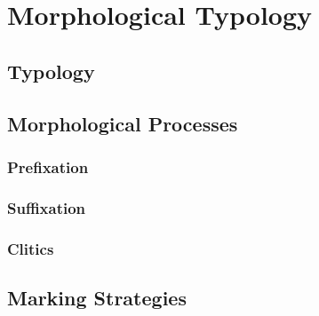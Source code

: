 \chapter{Morphological Typology}
\label{cha:morphological-typology}

\section{Typology}
\label{sec:typology}

\section{Morphological Processes}
\label{sec:morphological-processes}

\subsection{Prefixation}
\label{sec:prefixation}

\subsection{Suffixation}
\label{sec:suffixation}

\subsection{Clitics}
\label{sec:clitics}

\section{Marking Strategies}
\label{sec:marking-strategies}
